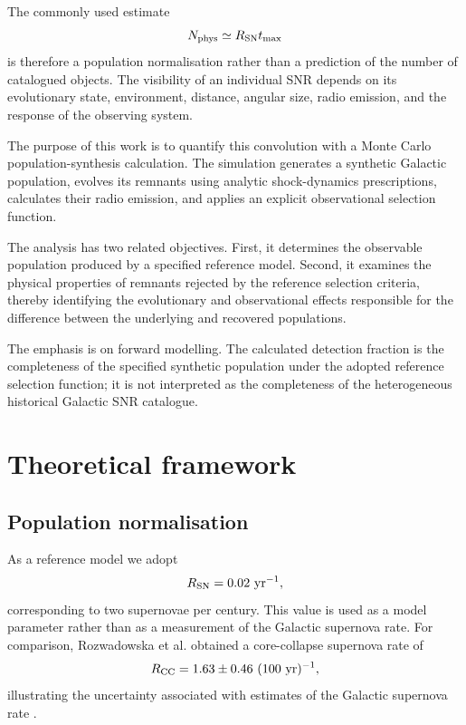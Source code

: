 \documentclass[
aps,
prd,
reprint,
superscriptaddress,
nofootinbib
]{revtex4-2}
\begin{document}
	The commonly used estimate
	\begin{equation}
		N_{\rm phys}\simeq R_{\rm SN}t_{\rm max}
		\label{eq:basic}
	\end{equation}
	is therefore a population normalisation rather than a prediction of the
	number of catalogued objects.  The visibility of an individual SNR depends
	on its evolutionary state, environment, distance, angular size, radio
	emission, and the response of the observing system.
	
	The purpose of this work is to quantify this convolution with a Monte Carlo
	population-synthesis calculation.  The simulation generates a synthetic
	Galactic population, evolves its remnants using analytic shock-dynamics
	prescriptions, calculates their radio emission, and applies an explicit
	observational selection function.
	
	The analysis has two related objectives.  First, it determines the observable
	population produced by a specified reference model.  Second, it examines the
	physical properties of remnants rejected by the reference selection criteria,
	thereby identifying the evolutionary and observational effects responsible for
	the difference between the underlying and recovered populations.
	
	The emphasis is on forward modelling.  The calculated detection fraction is
	the completeness of the specified synthetic population under the adopted
	reference selection function; it is not interpreted as the completeness of
	the heterogeneous historical Galactic SNR catalogue.
	
	\section{Theoretical framework}
	\label{sec:theory}
	
	\subsection{Population normalisation}
	
	As a reference model we adopt
	\begin{equation}
		R_{\rm SN}=0.02~\mathrm{yr^{-1}},
		\label{eq:rate}
	\end{equation}
	corresponding to two supernovae per century.  This value is used as a model
	parameter rather than as a measurement of the Galactic supernova rate.  For
	comparison, Rozwadowska et al. obtained a core-collapse supernova rate of
	\begin{equation}
		R_{\rm CC}=1.63\pm0.46~(100~\mathrm{yr})^{-1},
	\end{equation}
	illustrating the uncertainty associated with estimates of the Galactic
	supernova rate \cite{Rozwadowska2021}.
	
\end{document}
